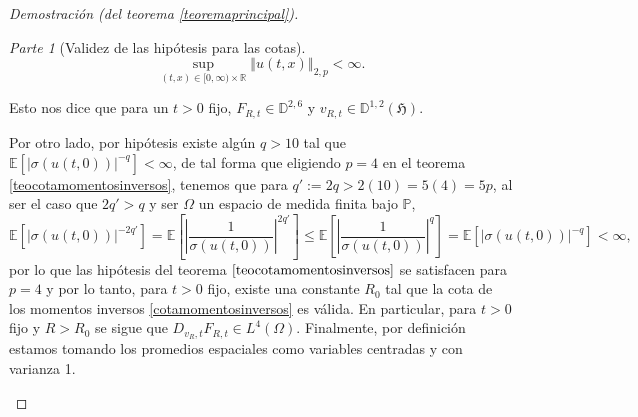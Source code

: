\documentclass[letterpaper,twoside,12pt]{book}
\newcommand{\R}{\mathbb{R}}
\newcommand{\D}{\mathbb{D}}
\newcommand{\E}{\mathbb{E}}
\renewcommand{\P}{\mathbb{P}}
\newcommand{\1}{\mathds{1}}
\newcommand{\abs}[1]{\left\lvert #1 \right\rvert}
\newcommand{\norm}[1]{\left\Vert #1 \right\Vert}
\theoremstyle{definition}
\theoremstyle{definition}
\theoremstyle{remark}
\newtheorem{proofpart}{Parte}
\theoremstyle{definition}
\theoremstyle{definition}
\theoremstyle{definition}
\theoremstyle{definition}
\theoremstyle{definition}
\begin{document}
\begin{proof}[Demostración (del teorema \ref{teoremaprincipal})]
\begin{proofpart}[Validez de las hipótesis para las cotas]
\begin{equation}\label{cotaunif}
      \sup_{(t,x)\in [0,\infty)\times\R}\norm{u(t,x)}_{2,p}<\infty.
\end{equation}

Esto nos dice que para un $t>0$ fijo, $F_{R,t}\in \D^{2,6}$ y $v_{R,t}\in \D^{1,2}(\mathfrak{H})$. 

Por otro lado, por hipótesis existe algún $q>10$ tal que $\E\left[\abs{\sigma(u(t,0))}^{-q}\right]<\infty$, de tal forma que eligiendo $p=4$ en el teorema \ref{teocotamomentosinversos}, tenemos que para $q':=2q>2(10)=5(4)=5p$, al ser el caso que $2q'>q$ y ser $\Omega$ un espacio de medida finita bajo $\P$, 
\[
\E\left[\abs{\sigma(u(t,0))}^{-2q'}\right]=\E\left[\abs{\frac{1}{\sigma(u(t,0))}}^{2q'}\right]\leq \E\left[\abs{\frac{1}{\sigma(u(t,0))}}^{q}\right]=\E\left[\abs{\sigma(u(t,0))}^{-q}\right]<\infty,
\]
por lo que las hipótesis del teorema $\ref{teocotamomentosinversos}$ se satisfacen para $p=4$ y por lo tanto, para $t>0$ fijo, existe una constante $R_0$ tal que la cota de los momentos inversos \eqref{cotamomentosinversos} es válida. En particular, para $t>0$ fijo y $R>R_0$ se sigue que $D_{v_R,t}F_{R,t}\in L^{4}(\Omega)$. Finalmente, por definición estamos tomando los promedios espaciales como variables centradas y con varianza 1. 


\end{proofpart}
\end{proof}
\end{document}
